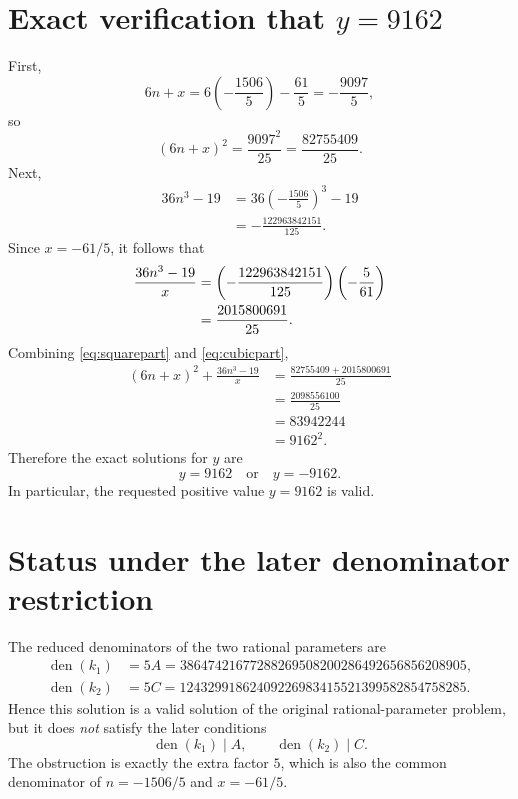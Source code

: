 \documentclass[11pt]{article}
\begin{document}
\section{Exact verification that \texorpdfstring{\(y=9162\)}{y=9162}}

First,
\begin{equation}\label{eq:linearpart}
6n+x
=6\left(-\frac{1506}{5}\right)-\frac{61}{5}
=-\frac{9097}{5},
\end{equation}
so
\begin{equation}\label{eq:squarepart}
(6n+x)^2=\frac{9097^2}{25}
=\frac{82755409}{25}.
\end{equation}
Next,
\begin{align*}
36n^3-19
&=36\left(-\frac{1506}{5}\right)^3-19\\
&=-\frac{122963842151}{125}.
\end{align*}
Since \(x=-61/5\), it follows that
\begin{align}
\frac{36n^3-19}{x}
&=\left(-\frac{122963842151}{125}\right)
  \left(-\frac{5}{61}\right)\notag\\
&=\frac{2015800691}{25}.\label{eq:cubicpart}
\end{align}
Combining \eqref{eq:squarepart} and \eqref{eq:cubicpart},
\begin{align*}
(6n+x)^2+\frac{36n^3-19}{x}
&=\frac{82755409+2015800691}{25}\\
&=\frac{2098556100}{25}\\
&=83942244\\
&=9162^2.
\end{align*}
Therefore the exact solutions for \(y\) are
\begin{equation}
\boxed{y=9162\quad\text{or}\quad y=-9162.}
\end{equation}
In particular, the requested positive value \(y=9162\) is valid.

\section{Status under the later denominator restriction}

The reduced denominators of the two rational parameters are
\begin{align*}
\operatorname{den}(k_1)&=5A
 =38647421677288269508200286492656856208905,\\
\operatorname{den}(k_2)&=5C
 =12432991862409226983415521399582854758285.
\end{align*}
Hence this solution is a valid solution of the original rational-parameter
problem, but it does \emph{not} satisfy the later conditions
\[
\operatorname{den}(k_1)\mid A,
\qquad
\operatorname{den}(k_2)\mid C.
\]
The obstruction is exactly the extra factor \(5\), which is also the common
denominator of \(n=-1506/5\) and \(x=-61/5\).
\end{document}
